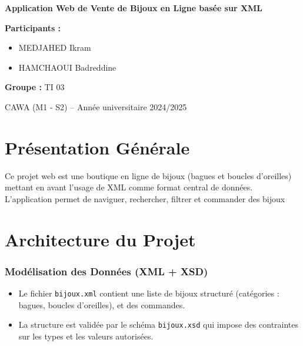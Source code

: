 \documentclass[14pt]{extarticle}
\begin{document}
\begin{titlepage}
  \begin{center}
 
   \begin{spacing}{1.5}
    {\Large \bfseries Application Web de Vente de Bijoux en Ligne basée sur XML}
\end{spacing}


        \vspace{1.5cm}
  \end{center}
     
\vspace{5cm}
        \textbf{Participants :}  
        \begin{itemize}[label=-]
            \item MEDJAHED Ikram
            \item HAMCHAOUI Badreddine
        \end{itemize}

        \textbf{Groupe :} TI 03 \\
\begin{center}
    \vspace{1.5cm}
        { CAWA (M1 - S2) – Année universitaire 2024/2025} \\
\end{center}
    \vfill
\end{titlepage}

\section*{Présentation Générale}
Ce projet web est une boutique en ligne de bijoux (bagues et boucles d’oreilles) mettant en avant l’usage de XML comme format central de données. L'application permet de naviguer, rechercher, filtrer et commander des bijoux

\section*{Architecture du Projet}
\subsubsection*{Modélisation des Données (XML + XSD)}
\begin{itemize}[label=-]
    \item Le fichier \texttt{bijoux.xml} contient une liste de bijoux structuré (catégories : bagues, boucles d’oreilles), et des commandes.
    \item La structure est validée par le schéma \texttt{bijoux.xsd} qui impose des contraintes sur les types et les valeurs autorisées.
\end{itemize}
\end{document}
